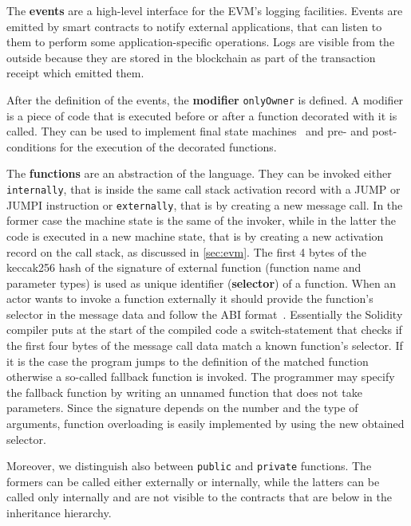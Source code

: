 The \textbf{events} are a high-level interface for the EVM's logging 
facilities. Events are emitted by smart contracts to notify external 
applications, that can listen to them to perform some application-specific
operations. Logs are visible from the outside because they are stored
in the blockchain as part of the transaction receipt which emitted them.

After the definition of the events, the \textbf{modifier} \verb|onlyOwner| is
defined. A modifier is a piece of code that is executed before or after a 
function decorated with it is called. They can be used to implement final
state machines~\cite{bib:solidity-docs} and pre- and post-conditions for the
execution of the decorated functions.

The \textbf{functions} are an abstraction of the language. They can be invoked 
either \texttt{internally}, that is inside the same call stack activation record
with a JUMP or JUMPI instruction or \texttt{externally}, that is by creating a
new message call. In the former case the machine state is the same of the
invoker, while in the latter the code is executed in a new machine state, that
is by creating a new activation record on the call stack, as discussed in
\autoref{sec:evm}.
The first 4 bytes of the keccak256 hash of the signature of external function
(function name and parameter types) is used as unique identifier
(\textbf{selector}) of a function. When an actor wants to invoke a function
externally it should provide the function's selector in the message data and
follow the ABI format~\cite{bib:solidity-docs}.
Essentially the Solidity compiler puts at the start of the compiled code a
switch-statement that checks if the first four bytes of the message call data
match a known function's selector. If it is the case the program jumps to the
definition of the matched function otherwise a so-called fallback function is 
invoked.
The programmer may specify the fallback function by writing an unnamed function
that does not take parameters. Since the signature depends on the number and
the type of arguments, function overloading is easily implemented by using
the new obtained selector.

Moreover, we distinguish also between \texttt{public} and \texttt{private}
functions. The formers can be called either externally or internally, while the
latters can be called only internally and are not visible to the contracts that
are below in the inheritance hierarchy.

